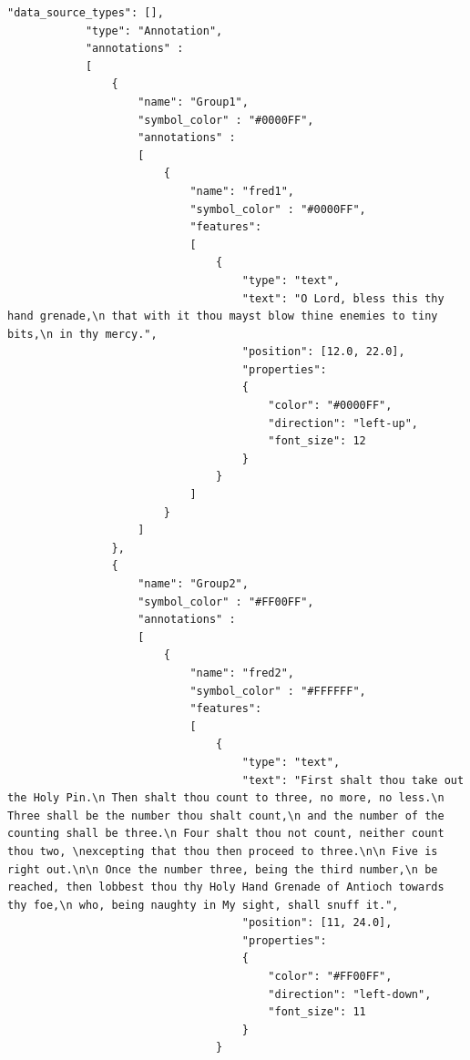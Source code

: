 \begin{lstlisting}[basicstyle=\small\ttfamily]
            "data_source_types": [],
            "type": "Annotation",
            "annotations" :
            [
                {
                    "name": "Group1",
                    "symbol_color" : "#0000FF",
                    "annotations" :
                    [
                        {
                            "name": "fred1",
                            "symbol_color" : "#0000FF",
                            "features":
                            [
                                {
                                    "type": "text",
                                    "text": "O Lord, bless this thy hand grenade,\n that with it thou mayst blow thine enemies to tiny bits,\n in thy mercy.",
                                    "position": [12.0, 22.0],
                                    "properties":
                                    {
                                        "color": "#0000FF",
                                        "direction": "left-up",
                                        "font_size": 12
                                    }
                                }
                            ]
                        }
                    ]
                },
                {
                    "name": "Group2",
                    "symbol_color" : "#FF00FF",
                    "annotations" :
                    [
                        {
                            "name": "fred2",
                            "symbol_color" : "#FFFFFF",
                            "features":
                            [
                                {
                                    "type": "text",
                                    "text": "First shalt thou take out the Holy Pin.\n Then shalt thou count to three, no more, no less.\n Three shall be the number thou shalt count,\n and the number of the counting shall be three.\n Four shalt thou not count, neither count thou two, \nexcepting that thou then proceed to three.\n\n Five is right out.\n\n Once the number three, being the third number,\n be reached, then lobbest thou thy Holy Hand Grenade of Antioch towards thy foe,\n who, being naughty in My sight, shall snuff it.",
                                    "position": [11, 24.0],
                                    "properties":
                                    {
                                        "color": "#FF00FF",
                                        "direction": "left-down",
                                        "font_size": 11
                                    }
                                }

\end{lstlisting}
